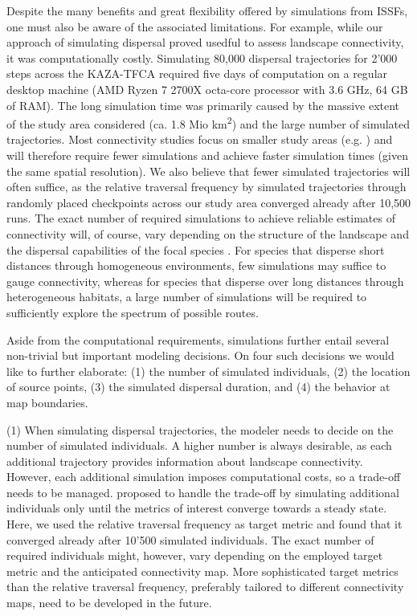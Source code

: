 \documentclass[abstract=on,10pt,a4paper,bibliography=totocnumbered]{article}
\begin{document}
Despite the many benefits and great flexibility offered by simulations from
ISSFs, one must also be aware of the associated limitations. For example, while
our approach of simulating dispersal proved usedful to assess landscape
connectivity, it was computationally costly. Simulating 80,000 dispersal
trajectories for 2'000 steps across the KAZA-TFCA required five days of
computation on a regular desktop machine (AMD Ryzen 7 2700X octa-core processor
with 3.6 GHz, 64 GB of RAM). The long simulation time was primarily caused by
the massive extent of the study area considered (ca. 1.8 Mio
km\textsuperscript{2}) and the large number of simulated trajectories. Most
connectivity studies focus on smaller study areas (e.g. \citealp{Kanagaraj.2013,
Clark.2015, McClure.2016, Abrahms.2017, Zeller.2020}) and will therefore require
fewer simulations and achieve faster simulation times (given the same spatial
resolution). We also believe that fewer simulated trajectories will often
suffice, as the relative traversal frequency by simulated trajectories through
randomly placed checkpoints across our study area converged already after 10,500
runs. The exact number of required simulations to achieve reliable estimates of
connectivity will, of course, vary depending on the structure of the landscape
and the dispersal capabilities of the focal species \citep{Gustafson.1996}. For
species that disperse short distances through homogeneous environments, few
simulations may suffice to gauge connectivity, whereas for species that disperse
over long distances through heterogeneous habitats, a large number of
simulations will be required to sufficiently explore the spectrum of possible
routes.

Aside from the computational requirements, simulations further entail several
non-trivial but important modeling decisions. On four such decisions we would
like to further elaborate: (1) the number of simulated individuals, (2) the
location of source points, (3) the simulated dispersal duration, and (4)
the behavior at map boundaries.

(1) When simulating dispersal trajectories, the modeler needs to decide on the
number of simulated individuals. A higher number is always desirable, as each
additional trajectory provides information about landscape connectivity.
However, each additional simulation imposes computational costs, so a trade-off
needs to be managed. \cite{Signer.2017} proposed to handle the trade-off by
simulating additional individuals only until the metrics of interest converge
towards a steady state. Here, we used the relative traversal frequency as target
metric and found that it converged already after 10'500 simulated individuals.
The exact number of required individuals might, however, vary depending on the
employed target metric and the anticipated connectivity map. More sophisticated
target metrics than the relative traversal frequency, preferably tailored to
different connectivity maps, need to be developed in the future.
\end{document}
